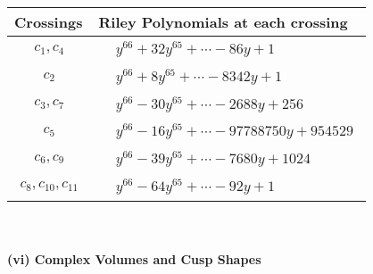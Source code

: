 \documentclass[1p]{elsarticle_modified}
\theoremstyle{definition}
\begin{document}
\begin{tabular}{m{50pt}|m{274pt}}
Crossings & \hspace{64pt}Riley Polynomials at each crossing \\
\hline $$\begin{aligned}c_{1},c_{4}\end{aligned}$$&$\begin{aligned}
&y^{66}+32 y^{65}+\cdots-86 y+1
\end{aligned}$\\
\hline $$\begin{aligned}c_{2}\end{aligned}$$&$\begin{aligned}
&y^{66}+8 y^{65}+\cdots-8342 y+1
\end{aligned}$\\
\hline $$\begin{aligned}c_{3},c_{7}\end{aligned}$$&$\begin{aligned}
&y^{66}-30 y^{65}+\cdots-2688 y+256
\end{aligned}$\\
\hline $$\begin{aligned}c_{5}\end{aligned}$$&$\begin{aligned}
&y^{66}-16 y^{65}+\cdots-97788750 y+954529
\end{aligned}$\\
\hline $$\begin{aligned}c_{6},c_{9}\end{aligned}$$&$\begin{aligned}
&y^{66}-39 y^{65}+\cdots-7680 y+1024
\end{aligned}$\\
\hline $$\begin{aligned}c_{8},c_{10},c_{11}\end{aligned}$$&$\begin{aligned}
&y^{66}-64 y^{65}+\cdots-92 y+1
\end{aligned}$\\
\hline
\end{tabular}\\~\\
\newpage\flushleft \textbf{(vi) Complex Volumes and Cusp Shapes}
\end{document}
